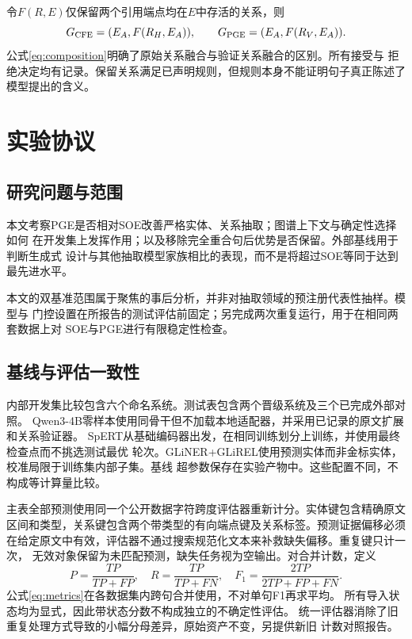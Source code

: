 \documentclass[12pt,a4paper,fontset=none]{ctexart}
\begin{document}
令$F(R,E)$仅保留两个引用端点均在$E$中存活的关系，则
\begin{equation}
G_{\rm CFE}=(E_A,F(R_H,E_A)),\qquad
G_{\rm PGE}=(E_A,F(R_V,E_A)).
\label{eq:composition}
\end{equation}
公式\eqref{eq:composition}明确了原始关系融合与验证关系融合的区别。所有接受与
拒绝决定均有记录。保留关系满足已声明规则，但规则本身不能证明句子真正陈述了
模型提出的含义。

\section{实验协议}
\label{sec:experiment}
\subsection{研究问题与范围}
本文考察PGE是否相对SOE改善严格实体、关系抽取；图谱上下文与确定性选择如何
在开发集上发挥作用；以及移除完全重合句后优势是否保留。外部基线用于判断生成式
设计与其他抽取模型家族相比的表现，而不是将超过SOE等同于达到最先进水平。

本文的双基准范围属于聚焦的事后分析，并非对抽取领域的预注册代表性抽样。模型与
门控设置在所报告的测试评估前固定；另完成两次重复运行，用于在相同两套数据上对
SOE与PGE进行有限稳定性检查。

\subsection{基线与评估一致性}
内部开发集比较包含六个命名系统。测试表包含两个晋级系统及三个已完成外部对照。
Qwen3-4B零样本使用同骨干但不加载本地适配器，并采用已记录的原文扩展和关系验证器。
SpERT从基础编码器出发，在相同训练划分上训练，并使用最终检查点而不挑选测试最优
轮次。GLiNER+GLiREL使用预测实体而非金标实体，校准局限于训练集内部子集。基线
超参数保存在实验产物中。这些配置不同，不构成等计算量比较。

主表全部预测使用同一个公开数据字符跨度评估器重新计分。实体键包含精确原文
区间和类型，关系键包含两个带类型的有向端点键及关系标签。预测证据偏移必须
在给定原文中有效，评估器不通过搜索规范化文本来补救缺失偏移。重复键只计一次，
无效对象保留为未匹配预测，缺失任务视为空输出。对合并计数，定义
\begin{equation}
P=\frac{TP}{TP+FP},\quad R=\frac{TP}{TP+FN},\quad
F_1=\frac{2TP}{2TP+FP+FN}.
\label{eq:metrics}
\end{equation}
公式\eqref{eq:metrics}在各数据集内跨句合并使用，不对单句F1再求平均。
所有导入状态均为显式，因此带状态分数不构成独立的不确定性评估。
统一评估器消除了旧重复处理方式导致的小幅分母差异，原始资产不变，另提供新旧
计数对照报告。
\end{document}
